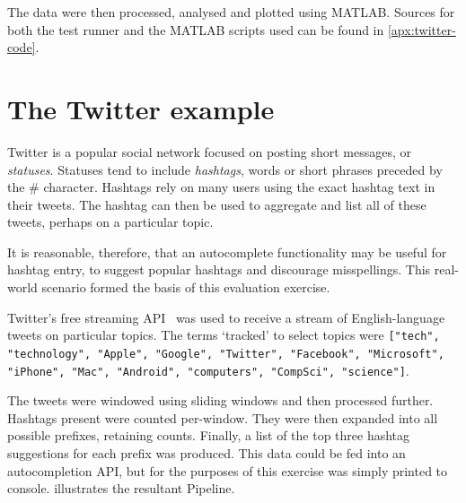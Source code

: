 The data were then processed, analysed and plotted using MATLAB.
Sources for both the test runner and the MATLAB scripts used can be found in \cref{apx:twitter-code}.

\section{The Twitter example}\label{sec:eval:approach:twitter}

Twitter is a popular social network focused on posting short messages, or \emph{statuses}.
Statuses tend to include \emph{hashtags}, words or short phrases preceded by the \# character.
Hashtags rely on many users using the exact hashtag text in their tweets.
The hashtag can then be used to aggregate and list all of these tweets, perhaps on a particular topic.

It is reasonable, therefore, that an autocomplete functionality may be useful for hashtag entry, to suggest popular hashtags and discourage misspellings.
This real-world scenario formed the basis of this evaluation exercise.

Twitter's free streaming API~\cite{TwitterStreamingAPI} was used to receive a stream of English-language tweets on particular topics.
The terms `tracked' to select topics were \texttt{["tech", "technology", "Apple", "Google", "Twitter", "Facebook", "Microsoft", "iPhone", "Mac", "Android", "computers", "CompSci", "science"]}.

The tweets were windowed using sliding windows and then processed further.
Hashtags present were counted per-window.
They were then expanded into all possible prefixes, retaining counts.
Finally, a list of the top three hashtag suggestions for each prefix was produced.
This data could be fed into an autocompletion API, but for the purposes of this exercise was simply printed to console.
 illustrates the resultant Pipeline.

